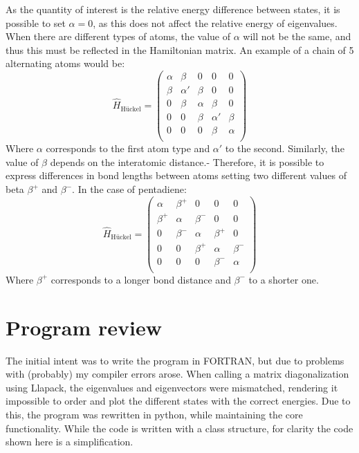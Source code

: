 \documentclass{article}
\begin{document}
As the quantity of interest is the relative energy difference between states, it is possible to set $\alpha=0$, as this does not affect the relative energy of eigenvalues. When there are different types of atoms, the value of $\alpha$ will not be the same, and thus this must be reflected in the Hamiltonian matrix. An example of a chain of 5 alternating atoms would be:
\begin{equation}
    \hat{H}_{\textrm{Hückel}}  =
    \begin{pmatrix}
        \alpha & \beta & 0 & 0 & 0 \\
        \beta & \alpha'  & \beta & 0 & 0 \\
        0 & \beta & \alpha & \beta & 0 \\
        0 & 0 & \beta & \alpha'  & \beta \\
        0 & 0 & 0 & \beta & \alpha \\
    \end{pmatrix}
\end{equation}
Where $\alpha$ corresponds to the first atom type and $\alpha'$ to the second. Similarly, the value of $\beta$ depends on the interatomic distance.- Therefore, it is possible to express differences in bond lengths between atoms setting two different values of beta $\beta^+$ and $\beta^-$. In the case of pentadiene: 
\begin{equation}
    \hat{H}_{\textrm{Hückel}}  =
    \begin{pmatrix}
        \alpha & \beta^+ & 0 & 0 & 0 \\
        \beta^+ & \alpha & \beta^- & 0 & 0 \\
        0 & \beta^- & \alpha & \beta^+ & 0 \\
        0 & 0 & \beta^+ & \alpha & \beta^- \\
        0 & 0 & 0 & \beta^- & \alpha \\
    \end{pmatrix}
\end{equation}
Where  $\beta^+$ corresponds to a longer bond distance and $\beta^-$ to a shorter one. 

\section{Program review}
The initial intent was to write the program in FORTRAN, but due to problems with (probably) my compiler errors arose. When calling a matrix diagonalization using Llapack, the eigenvalues and eigenvectors were mismatched, rendering it impossible to order and plot the different states with the correct energies. Due to this, the program was rewritten in python, while maintaining the core functionality. While the code is written with a class structure, for clarity the code shown here is a simplification. 
\end{document}
